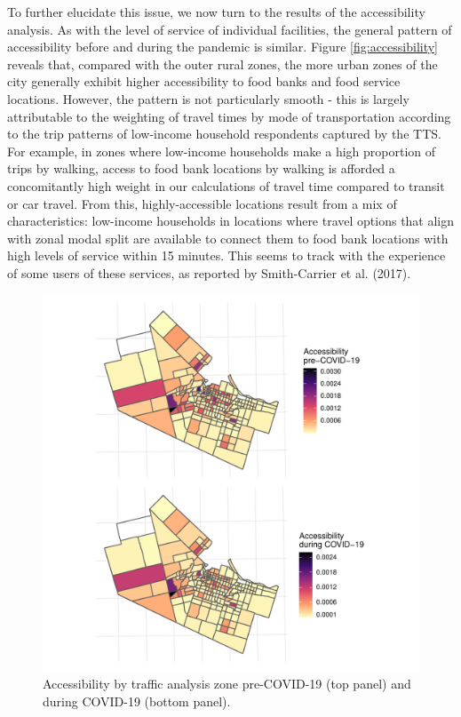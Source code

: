 \documentclass[]{elsarticle} %
\begin{document}
To further elucidate this issue, we now turn to the results of the
accessibility analysis. As with the level of service of individual
facilities, the general pattern of accessibility before and during the
pandemic is similar. Figure \ref{fig:accessibility} reveals that,
compared with the outer rural zones, the more urban zones of the city
generally exhibit higher accessibility to food banks and food service
locations. However, the pattern is not particularly smooth - this is
largely attributable to the weighting of travel times by mode of
transportation according to the trip patterns of low-income household
respondents captured by the TTS. For example, in zones where low-income
households make a high proportion of trips by walking, access to food
bank locations by walking is afforded a concomitantly high weight in our
calculations of travel time compared to transit or car travel. From
this, highly-accessible locations result from a mix of characteristics:
low-income households in locations where travel options that align with
zonal modal split are available to connect them to food bank locations
with high levels of service within 15 minutes. This seems to track with
the experience of some users of these services, as reported by
Smith-Carrier et al. (2017).

\begin{figure}

{\centering \includegraphics[width=1\linewidth]{Accessibility-Foodbanks-Hamilton_files/figure-latex/plot-accessibility-1} 

}

\caption{\label{fig:accessibility}Accessibility by traffic analysis zone pre-COVID-19 (top panel) and during COVID-19 (bottom panel).}\label{fig:plot-accessibility}
\end{figure}
\end{document}
